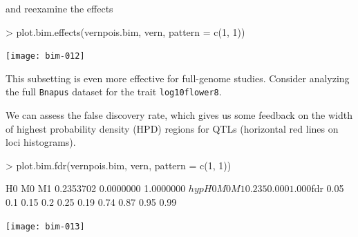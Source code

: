 \documentclass{article}
\begin{document}
\noindent and reexamine the effects

\begin{Schunk}
\begin{Sinput}
> plot.bim.effects(vernpois.bim, vern, pattern = c(1, 1))
\end{Sinput}
\end{Schunk}
\texttt{[image: bim-012]}

\noindent This subsetting is even more effective for full-genome
studies. Consider analyzing the full \texttt{Bnapus} dataset for the
trait \texttt{log10flower8}.

We can assess the false discovery rate, which gives us some feedback
on the width of highest probability density (HPD) regions for QTLs
(horizontal red lines on loci histograms).

\begin{Schunk}
\begin{Sinput}
> plot.bim.fdr(vernpois.bim, vern, pattern = c(1, 1))
\end{Sinput}
\begin{Soutput}
       H0        M0        M1 
0.2353702 0.0000000 1.0000000 
$hyp
   H0    M0    M1 
0.235 0.000 1.000 

$fdr
0.05  0.1 0.15  0.2 0.25 
0.19 0.74 0.87 0.95 0.99 
\end{Soutput}
\end{Schunk}
\texttt{[image: bim-013]}
\end{document}

